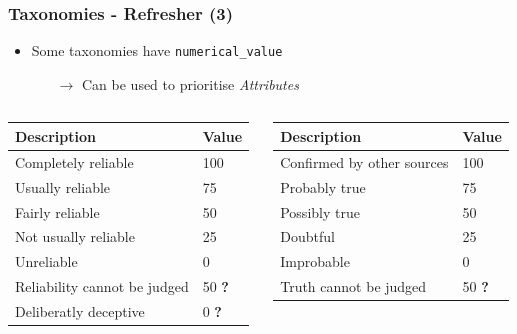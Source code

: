 \begin{frame}
    \frametitle{Taxonomies - Refresher (3)}
    \begin{itemize}
        \item Some taxonomies have \texttt{numerical\_value}
        \begin{itemize}
            \item[$\rightarrow$] Can be used to prioritise \textit{Attributes}
        \end{itemize}
    \end{itemize}
    \vspace{1cm}

    \begin{footnotesize}
    \begin{columns}[T] %
    \begin{column}{.40\textwidth}
        \begin{tabular}{|ll|}
            \hline
            \textbf{Description} & \textbf{Value}\\
            \hline
            Completely reliable & 100\\
            Usually reliable & 75\\
            Fairly reliable & 50\\
            Not usually reliable & 25\\
            Unreliable & 0\\
            Reliability cannot be judged & 50 \textbf{\color{red}?}\\
            Deliberatly deceptive & 0 \textbf{\color{red}?}\\
            \hline
        \end{tabular}
    \end{column}%
    \hfill%
    \begin{column}{.48\textwidth}
        \begin{tabular}{|ll|}
            \hline
            \textbf{Description} & \textbf{Value}\\
            \hline
            Confirmed by other sources & 100\\
            Probably true & 75\\
            Possibly true & 50\\
            Doubtful & 25\\
            Improbable & 0\\
            Truth cannot be judged & 50 \textbf{\color{red}?}\\
            \hline
        \end{tabular}
    \end{column}%
    \end{columns}
    \end{footnotesize}
\end{frame}

